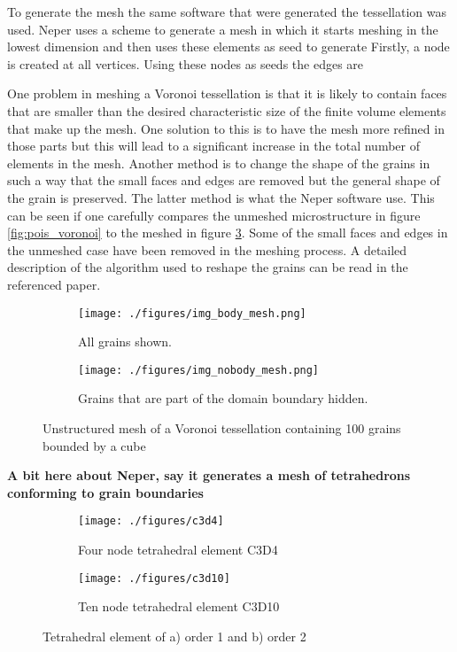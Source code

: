 \documentclass[meshing_micro.tex]{subfiles}
\begin{document}
 To generate the mesh the same software that were generated the tessellation was used. Neper uses a scheme to generate a mesh in which it starts meshing in the lowest dimension and then uses these elements as seed to generate  Firstly, a node is created at all vertices. Using these nodes as seeds the edges are 


One problem in meshing a Voronoi tessellation is that it is likely to contain faces that are smaller than the desired characteristic size of the finite volume elements that make up the mesh. One solution to this is to have the mesh more refined in those    parts but this will lead to a significant increase in the total number of elements in the mesh. Another method is to change the shape of the grains in such a way that the small faces and edges are removed but the general shape of the grain is preserved. The latter method is what the Neper software use. This can be seen if one carefully compares the unmeshed microstructure in figure \ref{fig:pois_voronoi} to the meshed in figure \ref{fig:pois_voronoi_mesh}. Some of the small faces and edges in the unmeshed case have been removed in the meshing process. A detailed description of the algorithm used to reshape the grains can be read in the referenced paper.


 
 \begin{figure}
\centering
\begin{subfigure}[b]{.5\textwidth}
  \centering
  \texttt{[image: ./figures/img\_body\_mesh.png]}
  \caption{All grains shown.}
  \label{fig:pois_voronoi_a_mesh}
\end{subfigure}%
\begin{subfigure}[b]{.5\textwidth}
  \centering
  \texttt{[image: ./figures/img\_nobody\_mesh.png]}
  \caption{Grains that are part of the domain boundary hidden.}
  \label{fig:pois_voronoi_b_mesh}
\end{subfigure}
\caption{Unstructured mesh of a Voronoi tessellation containing 100 grains bounded by a cube}
\label{fig:pois_voronoi_mesh}
\end{figure}


 \textbf{A bit here about Neper, say it generates a mesh of tetrahedrons conforming to grain boundaries }


\begin{figure}
\centering
\begin{subfigure}[b]{.5\textwidth}
  \centering
  \texttt{[image: ./figures/c3d4]}
  \caption{Four node tetrahedral element C3D4}
  \label{fig:mesh_a}
\end{subfigure}%
\begin{subfigure}[b]{.5\textwidth}
  \centering
  \texttt{[image: ./figures/c3d10]}
  \caption{Ten node tetrahedral element C3D10}
  \label{fig:mesh_b}
\end{subfigure}
\caption{Tetrahedral element of a) order 1 and b) order 2}
\label{fig:mesh}
\end{figure}
\end{document}
